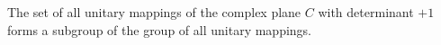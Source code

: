 The set of all unitary mappings of the complex plane $C$ with determinant $+1$ forms a subgroup of the group of all unitary mappings.
